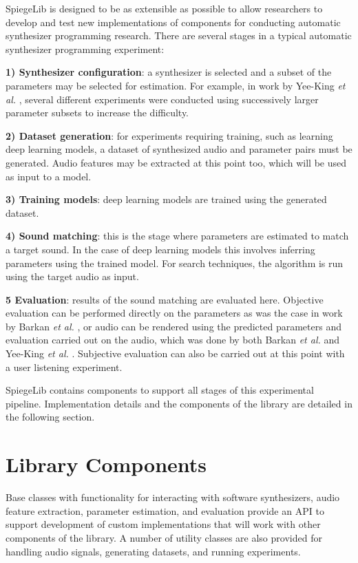 SpiegeLib is designed to be as extensible as possible to allow researchers to develop and test new implementations of components for conducting automatic synthesizer programming research. There are several stages in a typical automatic synthesizer programming experiment:

\textbf{1) Synthesizer configuration}: a synthesizer is selected and a subset of the parameters may be selected for estimation. For example, in work by Yee-King \textit{et al.} \cite{yee2018automatic}, several different experiments were conducted using successively larger parameter subsets to increase the difficulty.

\textbf{2) Dataset generation}: for experiments requiring training, such as learning deep learning models, a dataset of synthesized audio and parameter pairs must be generated. Audio features may be extracted at this point too, which will be used as input to a model.

\textbf{3) Training models}: deep learning models are trained using the generated dataset.

\textbf{4) Sound matching}: this is the stage where parameters are estimated to match a target sound. In the case of deep learning models this involves inferring parameters using the trained model. For search techniques, the algorithm is run using the target audio as input.

\textbf{5 Evaluation}: results of the sound matching are evaluated here. Objective evaluation can be performed directly on the parameters as was the case in work by Barkan \textit{et al.} \cite{barkan2019inversynth},  or audio can be rendered using the predicted parameters and evaluation carried out on the audio, which was done by both Barkan \textit{et al.} and Yee-King \textit{et al.} \cite{yee2018automatic}. Subjective evaluation can also be carried out at this point with a user listening experiment.

SpiegeLib contains components to support all stages of this experimental pipeline. Implementation details and the components of the library are detailed in the following section.


\section{Library Components}

Base classes with functionality for interacting with software synthesizers, audio feature extraction, parameter estimation, and evaluation provide an API to support development of custom implementations that will work with other components of the library. A number of utility classes are also provided for handling audio signals, generating datasets, and running experiments.

